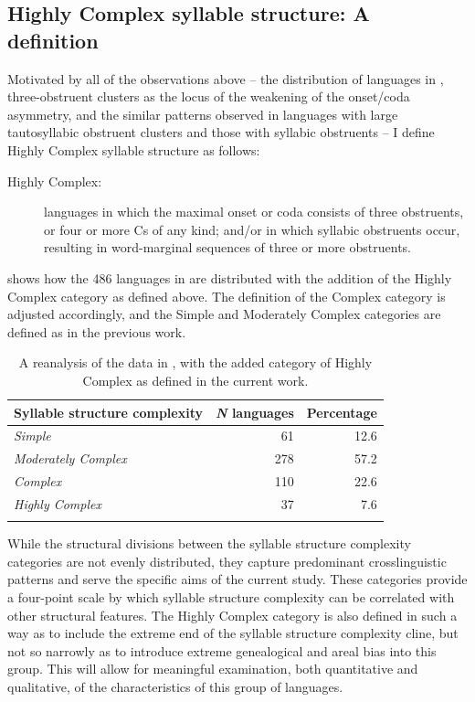 \subsection{Highly Complex syllable structure: A definition}\label{sec:2.2.2}

  Motivated by all of the observations above -- the distribution of languages in , three-obstruent clusters as the locus of the weakening of the onset/coda asymmetry, and the similar patterns observed in languages with large tautosyllabic obstruent clusters and those with syllabic obstruents -- I define Highly Complex syllable structure as follows:

\begin{description}
\item[Highly Complex:] languages in which the maximal onset or coda consists of three obstruents, or four or more Cs of any kind; and/or in which syllabic obstruents occur, resulting in word-marginal sequences of three or more obstruents.
\end{description}

   shows how the 486 languages in \citet{Maddieson2013a} are distributed with the addition of the Highly Complex category as defined above. The definition of the Complex category is adjusted accordingly, and the Simple and Moderately Complex categories are defined as in the previous work.

\begin{table}
\begin{tabular}{lrr}
\lsptoprule
Syllable structure complexity & {\textit{N}} {languages} & {Percentage}\\\midrule
\textit{Simple} & 61 & 12.6\\
\textit{Moderately Complex} & 278 & 57.2\\
\textit{Complex} & 110 & 22.6\\
\textit{Highly Complex} & 37 & 7.6\\
\lspbottomrule
\end{tabular}
\caption{\label{tab:2.3}A reanalysis of the data in \citet{Maddieson2013a}, with the added category of Highly Complex as defined in the current work.}
\end{table}

  While the structural divisions between the syllable structure complexity categories are not evenly distributed, they capture predominant crosslinguistic patterns and serve the specific aims of the current study. These categories provide a four-point scale by which syllable structure complexity can be correlated with other structural features. The Highly Complex category is also defined in such a way as to include the extreme end of the syllable structure complexity cline, but not so narrowly as to introduce extreme genealogical and areal bias into this group. This will allow for meaningful examination, both quantitative and qualitative, of the characteristics of this group of languages.

